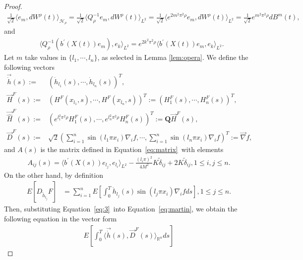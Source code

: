\documentclass[11pt]{article}
\numberwithin{equation}{section}%
\numberwithin{figure}{section}%
\theoremstyle{remark}
\begin{document}
\begin{proof}
\begin{align*}
	\frac{1}{\sqrt{2}}\langle e_{m},dW^{\rho}(t)\rangle_{\mathcal{H}_{\rho}}=\frac{1}{\sqrt{2}}\langle Q_{\rho}^{-1}e_{m},dW^{\rho}(t)\rangle_{L^{2}}=\frac{1}{\sqrt{2}}\langle e^{2m^{2}\pi^{2}\rho}e_{m},dW^{\rho}(t)\rangle_{L^{2}}=\frac{1}{\sqrt{2}}e^{m^{2}\pi^{2}\rho}dB^{m}(t),
\end{align*}
and
\begin{align*}
	&\langle Q_{\rho}^{-1}\left(b^{\prime}\left(X\left( t\right)\right)e_{m}\right),e_{k}\rangle_{L^{2}}
	=e^{2k^{2}\pi^{2}\rho}\langle b^{\prime}\left(X\left( t\right)\right)e_{m},e_{k}\rangle_{L^{2}}.
\end{align*}
	Let $m$ take values in $\{l_{1},\cdots,l_{n}\}$, as selected in Lemma \ref{lem:opera}. We define the following vectors 
		\begin{equation}\label{eq:vecdefq}
			\begin{split}
			\vec{\dot{h}}(s):=&(\dot{h}_{l_{1}}(s),\cdots,\dot{h}_{l_{n}}(s))^{T}, \\
			\vec{H}^{F}(s):=&(H^{F}(x_{l_{1}},s),\cdots,H^{F}(x_{l_{n}},s))^{T}:=(H_{1}^{F}(s),\cdots,H_{n}^{F}(s))^{T}, \\
			\vec{\hat{H}}^{F}(s):=&(e^{l_{1}^{2}\pi^{2}\rho}H_{1}^{F}(s),\cdots,e^{l_{n}^{2}\pi^{2}\rho}H_{n}^{F}(s))^{T}:=\mathbf{Q}\vec{H}^{F}(s), \\
	    	\vec{D}^{F}(s):=&\sqrt{2}(\sum_{i=1}^{n}\sin(l_{1}\pi x_{i})\nabla_{i} f,\cdots,\sum_{i=1}^{n}\sin(l_{n}\pi x_{i})\nabla_{i} f)^{T}:=\vec{\nabla}f,
	    	\end{split}
		\end{equation}
		and $A(s)$ is the matrix defined in Equation~\eqref{eq:matrix}~with elements 
		\begin{align*}
			A_{ij}(s)=\langle  b^{\prime}\left(X\left( s\right)\right)e_{l_{j}},e_{l_{i}}\rangle_{L^{2}}-\frac{(l_{i}\pi)^{2}}{4M^{2}}K\tilde{\delta}_{ij}+2K\tilde{\delta}_{ij},1\leq i,j\leq n.
		\end{align*}
		On the other hand, by definition
		\begin{align*}
			E[D_{\tilde{h}_{l_{j}}}F]&
			=\sum_{i=1}^{n}E[\int_{0}^{T}\dot{h}_{l_{j}}(s)\sin(l_{j}\pi x_{i})\nabla_{i} f ds],1\leq j\leq n.
		\end{align*}
		Then, substituting Equation~\eqref{eq:3}~into Equation~\eqref{eq:martin}, we obtain the following equation in the vector form
		\begin{align*}
			E[\int_{0}^{T}\langle \vec{\dot{h}}(s),\vec{D}^{F}(s)\rangle_{\mathbb{R}^{n}} ds]

\end{align*}
\end{proof}
\end{document}
